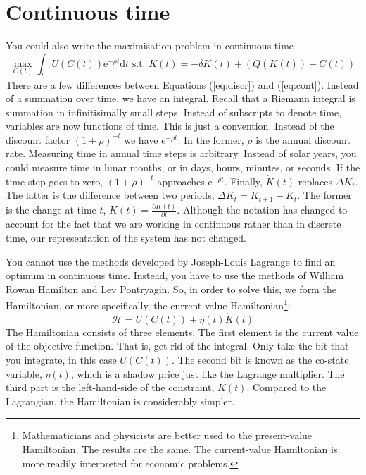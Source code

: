 \section{Continuous time}
You could also write the maximisation problem in continuous time
\begin{equation}
\label{eq:cont}
	\max_{C(t)} \int_t U(C(t)) \mathrm{e}^{-\rho t} \mathrm{d}t  \text{ s.t. } \dot{K}(t) = -\delta K(t) + (Q(K(t)) - C(t))
\end{equation}
There are a few differences between Equations (\ref{eq:discr}) and (\ref{eq:cont}). Instead of a summation over time, we have an integral. Recall that a Riemann integral is summation in infinitisimally small steps. Instead of subscripts to denote time, variables are now functions of time. This is just a convention. Instead of the discount factor $(1+\rho)^{-t}$ we have $\mathrm{e}^{-\rho t}$. In the former, $\rho$ is the annual discount rate. Measuring time in annual time steps is arbitrary. Instead of solar years, you could measure time in lunar months, or in days, hours, minutes, or seconds. If the time step goes to zero,  $(1+\rho)^{-t}$ approaches $\mathrm{e}^{-\rho t}$. Finally, $\dot{K}(t)$ replaces $\Delta K_t$. The latter is the difference between two periods, $\Delta K_t = K_{t+1} - K_{t}$. The former is the change at time $t$,  $\dot{K}(t) = \frac{\partial K(t)}{\partial t}$. Although the notation has changed to account for the fact that we are working in continuous rather than in discrete time, our representation of the system has not changed.

You cannot use the methods developed by Joseph-Louis Lagrange to find an optimum in continuous time. Instead, you have to use the methods of William Rowan Hamilton and Lev Pontryagin. So, in order to solve this, we form the Hamiltonian, or more specifically, the current-value Hamiltonian\footnote{Mathematicians and physicists are better used to the present-value Hamiltonian. The results are the same. The current-value Hamiltonian is more readily interpreted for economic problems.}:
\begin{equation}
\label{eq:hamilton}
	\mathcal{H} = U(C(t)) + \eta(t) \dot{K}(t)
\end{equation}
The Hamiltonian consists of three elements. The first element is the current value of the objective function. That is, get rid of the integral. Only take the bit that you integrate, in this case $U(C(t))$. The second bit is known as the co-state variable, $\eta(t)$, which is a shadow price just like the Lagrange multiplier. The third part is the left-hand-side of the constraint, $\dot{K}(t)$. Compared to the Lagrangian, the Hamiltonian is considerably simpler.


